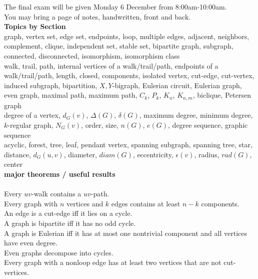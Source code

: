 \documentclass[12pt]{article}
\theoremstyle{homework}
\begin{document}
The final exam will be given Monday 6 December from 8:00am-10:00am.\\

You may bring a page of notes, handwritten, front and back.\\

\noindent \textbf{Topics by Section}\\

  graph, vertex set, edge set, endpoints, loop, multiple edges, adjacent, neighbors, complement, clique, independent set, stable set, bipartite graph, subgraph, connected, disconnected, isomorphism, isomorphism class\\


  walk, trail, path, internal vertices of a walk/trail/path, endpoints of a walk/trail/path, length, closed, components, isolated vertex, cut-edge, cut-vertex, induced subgraph, bipartition, $X,Y$-bigraph, Eulerian circuit, Eulerian graph, even graph, maximal path, maximum path, $C_k$, $P_k$, $K_n$, $K_{n,m}$, biclique, Petersen graph\\

 degree of a vertex, $d_G(v)$, $\Delta(G)$, $\delta(G)$, maximum degree, minimum degree, $k$-regular graph, $N_G(v)$, order, size, $n(G)$, $e(G)$, degree sequence, graphic sequence\\

 acyclic, forest, tree, leaf, pendant vertex, spanning subgraph, spanning tree, star, distance, $d_G(u,v)$, diameter, $diam(G)$, eccentricity, $\epsilon(v)$, radius, $rad(G)$, center\\

\noindent \textbf{major theorems / useful results}\\

\\
Every $uv$-walk contains a $uv$-path.\\
Every graph with $n$ vertices and $k$ edges contains at least $n-k$ components.\\
An edge is a cut-edge iff it lies on a cycle.\\
A graph is bipartite iff it has no odd cycle.\\
A graph is Eulerian iff it has at most one nontrivial component and all vertices have even degree.\\
Even graphs decompose into cycles.\\
Every graph with a nonloop edge has at least two vertices that are not cut-vertices.\\
\end{document}
